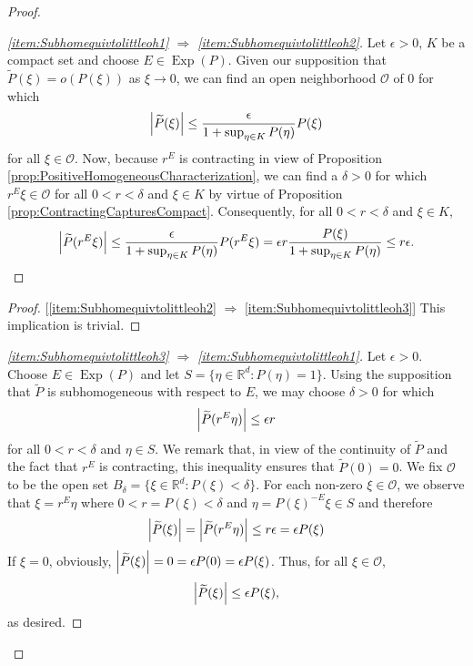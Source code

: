 \documentclass[11pt]{article}
\theoremstyle{remark}
\newcommand*{\myproofname}{Proof}
\newenvironment{subproof}[1][\myproofname]{\begin{proof}[#1]\renewcommand*{\qedsymbol}{$\mathbin{/\mkern-6mu/}$}}{\end{proof}}
\newcommand\Exp{\operatorname{Exp}}
\begin{document}
\begin{proof}
\begin{subproof}[\ref{item:Subhomequivtolittleoh1} $\Rightarrow$ \ref{item:Subhomequivtolittleoh2}] Let $\epsilon>0$, $K$ be a compact set and choose $E\in \Exp(P)$. Given our supposition that $\widetilde{P}(\xi)=o(P(\xi))$ as $\xi\to 0$, we can find an open neighborhood $\mathcal{O}$ of $0$ for which 
\begin{equation*}
\abs{\widetilde{P}(\xi)}\leq \frac{\epsilon}{1+\sup_{\eta\in K}P(\eta)}P(\xi)
\end{equation*}
for all $\xi\in \mathcal{O}$. Now, because $r^E$ is contracting in view of Proposition \ref{prop:PositiveHomogeneousCharacterization}, we can find a $\delta>0$ for which $r^E\xi\in \mathcal{O}$ for all $0<r<\delta$ and $\xi\in K$ by virtue of Proposition \ref{prop:ContractingCapturesCompact}. Consequently, for all $0<r<\delta$ and $\xi\in K$,
\begin{equation*}
\abs{\widetilde{P}(r^E\xi)}\leq \frac{\epsilon}{1+\sup_{\eta\in K}P(\eta)}P(r^E\xi)=\epsilon r\frac{P(\xi)}{1+\sup_{\eta\in K}P(\eta)}\leq r\epsilon.
\end{equation*}
\end{subproof}

\begin{subproof} [\ref{item:Subhomequivtolittleoh2} $\Rightarrow$ \ref{item:Subhomequivtolittleoh3}] This implication is trivial.
\end{subproof}
 
 \begin{subproof}[\ref{item:Subhomequivtolittleoh3} $\Rightarrow$ \ref{item:Subhomequivtolittleoh1}]  Let $\epsilon>0$. Choose $E\in \Exp(P)$ and let $S=\{\eta\in\mathbb{R}^d:P(\eta)=1\}$. Using the supposition that $\widetilde{P}$ is subhomogeneous with respect to $E$, we may choose $\delta>0$ for which
\begin{equation*}
\abs{\widetilde{P}(r^E\eta)}\leq \epsilon r 
\end{equation*}
 for all $0<r<\delta$ and $\eta\in S$. We remark that, in view of the continuity of $\widetilde{P}$ and the fact that $r^E$ is contracting, this inequality ensures that $\widetilde{P}(0)=0$. We fix $\mathcal{O}$ to be the open set $B_\delta=\{\xi\in\mathbb{R}^d:P(\xi)<\delta\}$. For each non-zero $\xi\in\mathcal{O}$, we observe that $\xi=r^E\eta$ where $0<r=P(\xi)<\delta$ and $\eta=P(\xi)^{-E}\xi\in S$ and therefore
\begin{equation*}
\abs{\widetilde{P}(\xi)}=\abs{\widetilde{P}(r^E\eta)}\leq r\epsilon=\epsilon  P(\xi)
\end{equation*}
If $\xi=0$, obviously, $\abs{\widetilde{P}(\xi)}=0=\epsilon P(0)=\epsilon P(\xi)$. Thus, for all $\xi\in\mathcal{O}$,
\begin{equation*}
\abs{\widetilde{P}(\xi)}\leq\epsilon P(\xi),
\end{equation*}
as desired.
\end{subproof}
\end{proof}
\end{document}

